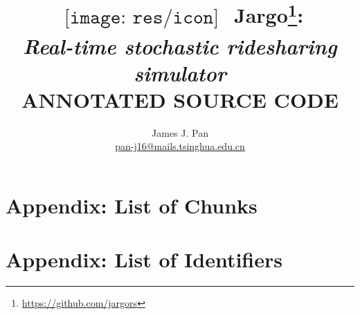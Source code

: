 \documentclass{report}
\title{
$
\begin{array}{l}
\texttt{[image: res/icon]}
\end{array}
$
Jargo\footnote{\url{https://github.com/jargors}}:\\
\large{\textbf{\textit{Real-time stochastic ridesharing simulator}}\\
\vspace{2em}
\small{\textsc{ANNOTATED SOURCE CODE}}}
}
\author{James J. Pan\\
  \small{\href{mailto:pan-j16@mails.tsinghua.edu.cn}{pan-j16@mails.tsinghua.edu.cn}}}
\theoremstyle{definition}                   %
\begin{document}
\maketitle
\pagestyle{noweb}

\renewcommand{\thepage}{\roman{page}}
\setcounter{page}{1}

\tableofcontents



\appendix

\chapter{Appendix: List of Chunks}
\nowebchunks

\chapter{Appendix: List of Identifiers}
\nowebindex
\end{document}
